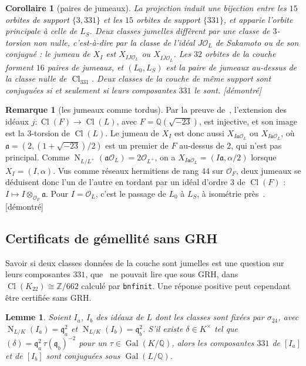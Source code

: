 \documentclass[11pt,a4paper]{amsart}
\theoremstyle{plain}
\newtheorem{lemma}[proposition]{Lemme}
\newtheorem{corollary}[proposition]{Corollaire}
\theoremstyle{definition}
\newtheorem{remark}[proposition]{Remarque}
\newcommand{\Q}{\mathbb{Q}}
\newcommand{\Z}{\mathbb{Z}}
\newcommand{\OO}{\mathcal{O}}
\newcommand{\q}{\mathfrak{q}}
\DeclareMathOperator{\Nm}{N}
\DeclareMathOperator{\Cl}{Cl}
\DeclareMathOperator{\Gal}{Gal}
\newcommand{\Lz}{L_{0}}
\newcommand{\LS}{L_{S}}
\newcommand{\st}[1]{\textup{\textsf{\small[#1]}}}
\newcommand{\DEM}{\st{démontré}}
\begin{document}
\begin{corollary}[paires de jumeaux]\label{cor:twins}
La projection induit une bijection entre les $15$ orbites de support $\{3,331\}$ et les $15$ orbites de support $\{331\}$, et apparie l'orbite principale à celle de $\LS$. Deux classes jumelles diffèrent par une classe de $3$-torsion non nulle, c'est-à-dire par la classe de l'idéal $J\OO_L$ de Sakamoto ou de son conjugué : le jumeau de $X_I$ est $X_{IJ\OO_L}$ ou $X_{I\bar J\OO_L}$. Les $32$ orbites de la couche forment $16$ paires de jumeaux, et $(\Lz,\LS)$ est la paire de jumeaux au-dessus de la classe nulle de $\Cl_{331}$. Deux classes de la couche de même support sont conjuguées si et seulement si leurs composantes $331$ le sont. \DEM
\end{corollary}

\begin{remark}[les jumeaux comme tordus]
Par la preuve de~\cite[prop.~6.7]{Gau26}, l'extension des idéaux $j\colon\Cl(F)\to\Cl(L)$, avec $F=\Q(\sqrt{-23})$, est injective, et son image est la $3$-torsion de $\Cl(L)$. Le jumeau de $X_I$ est donc aussi $X_{I\mathfrak a\OO_L}$ ou $X_{I\bar{\mathfrak a}\OO_L}$, où $\mathfrak a=(2,(1+\sqrt{-23})/2)$ est un premier de $F$ au-dessus de $2$, qui n'est pas principal. Comme $\Nm_{L/L^+}(\mathfrak a\OO_L)=2\OO_{L^+}$, on a $X_{I\mathfrak a\OO_L}=(I\mathfrak a,\alpha/2)$ lorsque $X_I=(I,\alpha)$. Vus comme réseaux hermitiens de rang $44$ sur $\OO_F$, deux jumeaux se déduisent donc l'un de l'autre en tordant par un idéal d'ordre $3$ de $\Cl(F)$ : $I\mapsto I\otimes_{\OO_F}\mathfrak a$. Pour $I=\OO_L$, c'est le passage de $\Lz$ à $\LS$, à isométrie près~\cite[prop.~2.7]{Gau26}. \DEM
\end{remark}

\subsection{Certificats de gémellité sans GRH}
Savoir si deux classes données de la couche sont jumelles est une question sur leurs composantes $331$, que~\cite{Gau26} ne pouvait lire que sous GRH, dans $\Cl(K_{22})\cong\Z/662$ calculé par \texttt{bnfinit}. Une réponse positive peut cependant être certifiée sans GRH.

\begin{lemma}\label{lem:cert}
Soient $I_a$, $I_b$ des idéaux de $L$ dont les classes sont fixées par $\sigma_{24}$, avec $\Nm_{L/K}(I_a)=\q_a^2$ et $\Nm_{L/K}(I_b)=\q_b^2$. S'il existe $\delta\in K^\times$ tel que $(\delta)=\q_a^2\,\tau(\q_b)^{-2}$ pour un $\tau\in\Gal(K/\Q)$, alors les composantes $331$ de $[I_a]$ et de $[I_b]$ sont conjuguées sous $\Gal(L/\Q)$.
\end{lemma}
\end{document}
